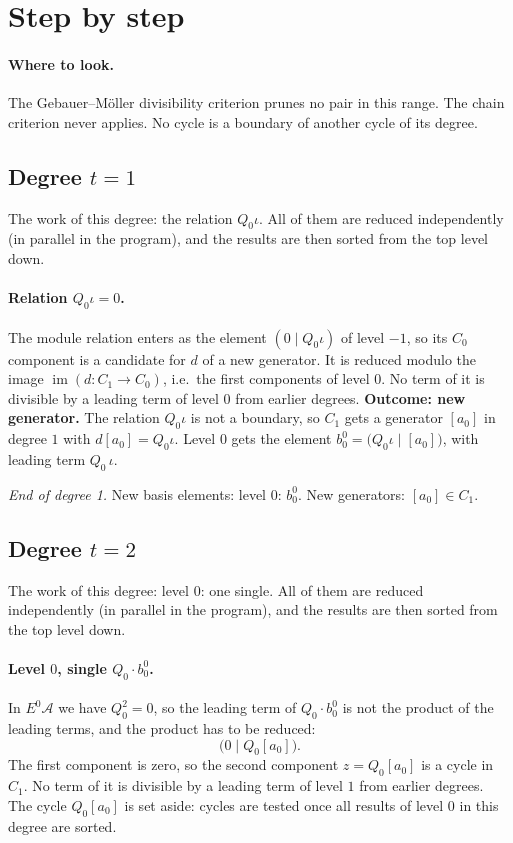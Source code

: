 \documentclass[11pt]{article}
\newcommand{\A}{\mathcal{A}}
\begin{document}
\section{Step by step}

\paragraph{Where to look.} The Gebauer--M\"oller divisibility criterion prunes no pair in this range. The chain criterion never applies. No cycle is a boundary of another cycle of its degree.

\subsection*{Degree $t = 1$}
\noindent The work of this degree: the relation $Q_{0}\iota$. All of them are reduced independently (in parallel in the program), and the results are then sorted from the top level down.
\medskip
\paragraph{Relation $Q_{0}\iota = 0$.} The module relation enters as the element $(0 \mid Q_{0}\iota)$ of level $-1$, so its $C_0$ component is a candidate for $d$ of a new generator. It is reduced modulo the image $\operatorname{im}(d\colon C_1\to C_0)$, i.e.\ the first components of level $0$.
No term of it is divisible by a leading term of level $0$ from earlier degrees.
\textbf{Outcome: new generator.} The relation $Q_{0}\iota$ is not a boundary, so $C_{1}$ gets a generator $[a_0]$ in degree $1$ with $d[a_0] = Q_{0}\iota$.
Level $0$ gets the element $b^{0}_{0} = \bigl(Q_{0}\iota \;\big|\; [a_0]\bigr)$, with leading term $Q_{0}\,\iota$.
\medskip
\par\noindent\emph{End of degree 1.} New basis elements: level $0$: $b^{0}_{0}$. New generators: $[a_0]\in C_{1}$.
\subsection*{Degree $t = 2$}
\noindent The work of this degree: level $0$: one single. All of them are reduced independently (in parallel in the program), and the results are then sorted from the top level down.
\medskip
\paragraph{Level $0$, single $Q_{0}\cdot b^{0}_{0}$.} In $E^0\A$ we have $Q_{0}^2 = 0$, so the leading term of $Q_{0}\cdot b^{0}_{0}$ is not the product of the leading terms, and the product has to be reduced:
\[\bigl(0 \;\big|\; Q_{0}[a_0]\bigr).\]
The first component is zero, so the second component $z = Q_{0}[a_0]$ is a cycle in $C_{1}$.
No term of it is divisible by a leading term of level $1$ from earlier degrees.
The cycle $Q_{0}[a_0]$ is set aside: cycles are tested once all results of level $0$ in this degree are sorted.
\medskip
\end{document}
